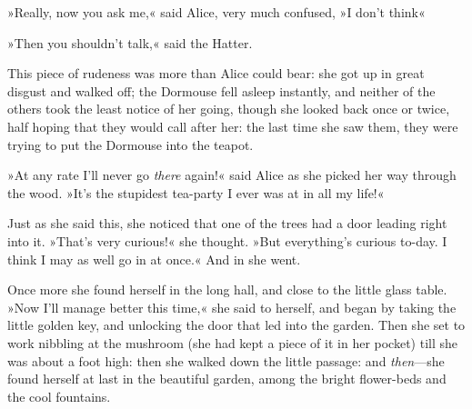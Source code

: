 »Really, now you ask me,« said Alice, very much confused, »I don't think\longdash«

»Then you shouldn't talk,« said the Hatter.

This piece of rudeness was more than Alice could bear: she got up in great disgust and walked off; the Dormouse fell asleep instantly, and neither of the others took the least notice of her going, though she looked back once or twice, half hoping that they would call after her: the last time she saw them, they were trying to put the Dormouse into the teapot.

»At any rate I'll never go \textit{there} again!« said Alice as she picked her way through the wood. »It's the stupidest tea-party I ever was at in all my life!«

Just as she said this, she noticed that one of the trees had a door leading right into it. »That's very curious!« she thought. »But everything's curious to-day. I think I may as well go in at once.« And in she went.

Once more she found herself in the long hall, and close to the little glass table. »Now I'll manage better this time,« she said to herself, and began by taking the little golden key, and unlocking the door that led into the garden. Then she set to work nibbling at the mushroom (she had kept a piece of it in her pocket) till she was about a foot high: then she walked down the little passage: and \textit{then}—she found herself at last in the beautiful garden, among the bright flower-beds and the cool fountains.